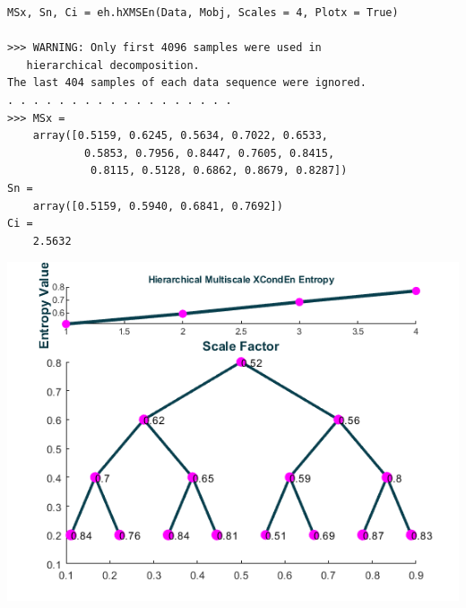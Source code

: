 \documentclass[12pt, a4paper, titlepage, openany]{book}
\begin{document}
\begin{verbatim}
MSx, Sn, Ci = eh.hXMSEn(Data, Mobj, Scales = 4, Plotx = True)
   
>>> WARNING: Only first 4096 samples were used in 
   hierarchical decomposition.
The last 404 samples of each data sequence were ignored. 
. . . . . . . . . . . . . . . . . .
>>> MSx = 
    array([0.5159, 0.6245, 0.5634, 0.7022, 0.6533,
    	 	0.5853, 0.7956, 0.8447, 0.7605, 0.8415, 
    	 	 0.8115, 0.5128, 0.6862, 0.8679, 0.8287])
Sn =
    array([0.5159, 0.5940, 0.6841, 0.7692])
Ci = 
	2.5632
\end{verbatim}
\includegraphics[scale=.75]{xhier.png}\newline \newline


\newpage
\end{document}
